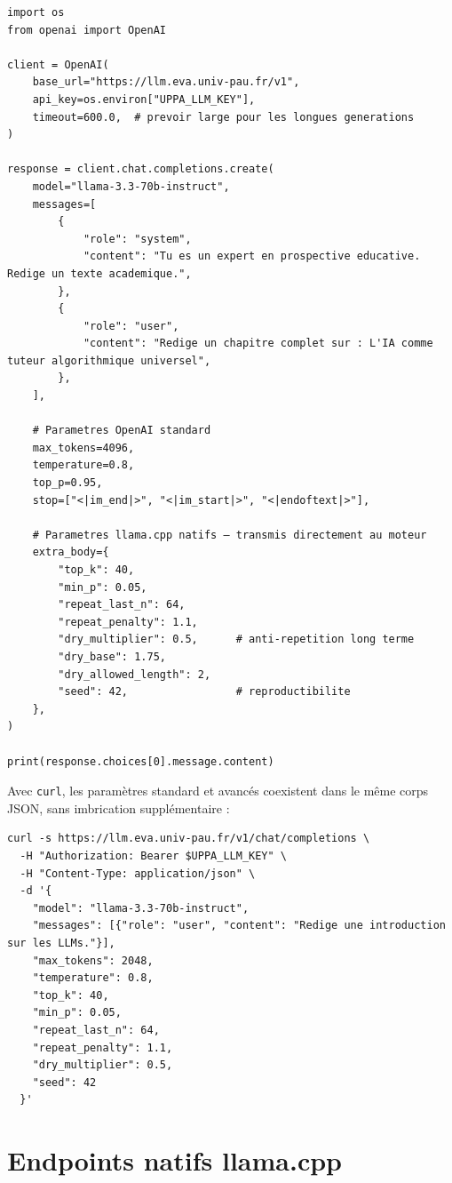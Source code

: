 \documentclass[12pt, a4paper, twoside]{article}
\begin{document}
\begin{lstlisting}[style=pythonstyle, caption={Génération longue avec paramètres llama.cpp via extra\_body}]
import os
from openai import OpenAI

client = OpenAI(
    base_url="https://llm.eva.univ-pau.fr/v1",
    api_key=os.environ["UPPA_LLM_KEY"],
    timeout=600.0,  # prevoir large pour les longues generations
)

response = client.chat.completions.create(
    model="llama-3.3-70b-instruct",
    messages=[
        {
            "role": "system",
            "content": "Tu es un expert en prospective educative. Redige un texte academique.",
        },
        {
            "role": "user",
            "content": "Redige un chapitre complet sur : L'IA comme tuteur algorithmique universel",
        },
    ],

    # Parametres OpenAI standard
    max_tokens=4096,
    temperature=0.8,
    top_p=0.95,
    stop=["<|im_end|>", "<|im_start|>", "<|endoftext|>"],

    # Parametres llama.cpp natifs — transmis directement au moteur
    extra_body={
        "top_k": 40,
        "min_p": 0.05,
        "repeat_last_n": 64,
        "repeat_penalty": 1.1,
        "dry_multiplier": 0.5,      # anti-repetition long terme
        "dry_base": 1.75,
        "dry_allowed_length": 2,
        "seed": 42,                 # reproductibilite
    },
)

print(response.choices[0].message.content)
\end{lstlisting}

Avec \texttt{curl}, les paramètres standard et avancés coexistent dans le même corps JSON,
sans imbrication supplémentaire :

\begin{lstlisting}[style=bashstyle, caption={Paramètres avancés avec curl}]
curl -s https://llm.eva.univ-pau.fr/v1/chat/completions \
  -H "Authorization: Bearer $UPPA_LLM_KEY" \
  -H "Content-Type: application/json" \
  -d '{
    "model": "llama-3.3-70b-instruct",
    "messages": [{"role": "user", "content": "Redige une introduction sur les LLMs."}],
    "max_tokens": 2048,
    "temperature": 0.8,
    "top_k": 40,
    "min_p": 0.05,
    "repeat_last_n": 64,
    "repeat_penalty": 1.1,
    "dry_multiplier": 0.5,
    "seed": 42
  }'
\end{lstlisting}

\section{Endpoints natifs llama.cpp}
\label{sec:endpoints-natifs}
\end{document}
